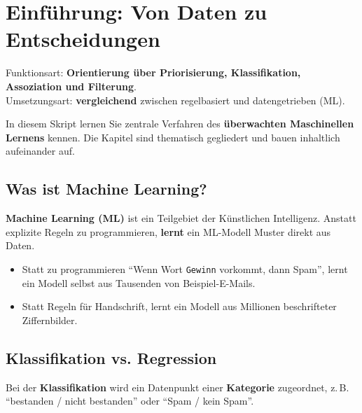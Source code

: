 \chapter{Einführung: Von Daten zu Entscheidungen}
\label{chap:einfuehrung}

\begin{myremark}
Funktionsart: \textbf{Orientierung über Priorisierung, Klassifikation, Assoziation und Filterung}. \\
Umsetzungsart: \textbf{vergleichend} zwischen regelbasiert und datengetrieben (ML).
\end{myremark}

\begin{myremark}
In diesem Skript lernen Sie zentrale Verfahren des \textbf{überwachten Maschinellen Lernens} kennen.
Die Kapitel sind thematisch gegliedert und bauen inhaltlich aufeinander auf.
\end{myremark}

\section{Was ist Machine Learning?}

\begin{mydefinition}
\textbf{Machine Learning (ML)} ist ein Teilgebiet der Künstlichen Intelligenz.
Anstatt explizite Regeln zu programmieren, \textbf{lernt} ein ML-Modell
Muster direkt aus Daten.
\end{mydefinition}

\begin{myexample}
\begin{itemize}
    \item Statt zu programmieren \enquote{Wenn Wort \texttt{Gewinn} vorkommt, dann Spam},
          lernt ein Modell selbst aus Tausenden von Beispiel-E-Mails.
    \item Statt Regeln für Handschrift, lernt ein Modell aus Millionen beschrifteter Ziffernbilder.
\end{itemize}
\end{myexample}

\section{Klassifikation vs. Regression}

\begin{mydefinition}[Klassifikation]
Bei der \textbf{Klassifikation} wird ein Datenpunkt einer
\textbf{Kategorie} zugeordnet, z.\,B. \enquote{bestanden / nicht bestanden} oder
\enquote{Spam / kein Spam}.
\end{mydefinition}

